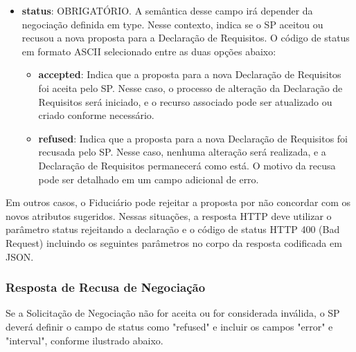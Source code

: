

\begin{itemize}
    
   \item \textbf{status}: OBRIGATÓRIO. A semântica desse campo irá depender da negociação definida em type. Nesse contexto, indica se o \acs{SP} aceitou ou recusou a nova proposta para a Declaração de Requisitos. O código de status em formato ASCII selecionado entre as duas opções abaixo:

    \begin{itemize}
        \item \textbf{accepted}: Indica que a proposta para a nova Declaração de Requisitos foi aceita pelo \acs{SP}. Nesse caso, o processo de alteração da Declaração de Requisitos será iniciado, e o recurso associado pode ser atualizado ou criado conforme necessário.
        
        \item \textbf{refused}: Indica que a proposta para a nova Declaração de Requisitos foi recusada pelo \acs{SP}. Nesse caso, nenhuma alteração será realizada, e a Declaração de Requisitos permanecerá como está. O motivo da recusa pode ser detalhado em um campo adicional de erro.
    \end{itemize}

\end{itemize}

Em outros casos, o Fiduciário pode rejeitar a proposta por não concordar com os novos atributos sugeridos. Nessas situações, a resposta HTTP deve utilizar o parâmetro status rejeitando a declaração e o código de status HTTP 400 (Bad Request) incluindo os seguintes parâmetros no corpo da resposta codificada em JSON.

\subsubsection{Resposta de Recusa de Negociação}\label{subsubsection:response-negotiation-error}

Se a Solicitação de Negociação não for aceita ou for considerada inválida, o SP deverá definir o campo de status como "refused" e incluir os campos "error" e "interval", conforme ilustrado abaixo.



